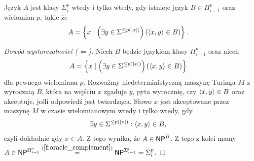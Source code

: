 \begin{lemma}\label{l:language_in_Sigma_p_iff}
    Język $A$ jest klasy $\Sigma_i^p$ wtedy i tylko wtedy, gdy istnieje język $B \in \Pi_{i-1}^p$ oraz wielomian $p$, takie że
    \[ A = \left\{x \mid \left(\exists y \in \Sigma^{\leq p(|x|)}\right) \left(\left\langle x, y \right\rangle \in B\right) \right\}. \]
\end{lemma}
\begin{proof}[Dowód wystarczalności ($\Leftarrow$)]
    Niech $B$ będzie językiem klasy $\Pi_{i-1}^p$ oraz niech
    \[ A = \left\{x \mid \left(\exists y \in \Sigma^{\leq p(|x|)}\right) \left(\left\langle x, y \right\rangle \in B\right) \right\} \]
    dla pewnego wielomianu $p$. Rozważmy niedeterministyczną maszynę Turinga $M$ z wyrocznią $B$, która na wejściu $x$ zgaduje $y$, pyta wyrocznię, czy $\left\langle x, y \right\rangle \in B$ oraz akceptuje, jeśli odpowiedź jest twierdząca. Słowo $x$ jest akceptowane przez maszynę $M$ w czasie wielomianowym wtedy i tylko wtedy, gdy
    \[ \exists y \in \Sigma^{\leq p(|x|)} : \left\langle x, y \right\rangle \in B, \]
    czyli dokładnie gdy $x \in A$. Z tego wynika, że $A \in \textsf{NP}^B$.
    Z tego z kolei mamy $A \in \textsf{NP}^{\Pi_{i-1}^p} \overset{(\ref{f:oracle_complement})}{=} \textsf{NP}^{\Sigma_{i-1}^p} = \Sigma_i^p $.
\end{proof}
